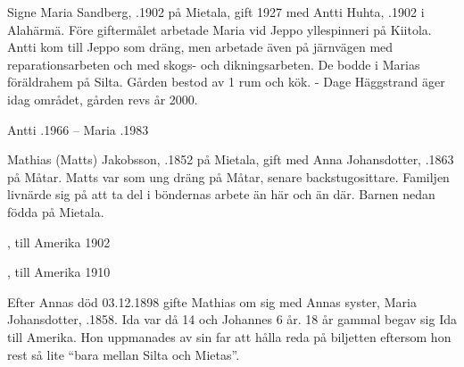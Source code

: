 


Signe Maria Sandberg, .1902 på Mietala, gift 1927 med Antti Huhta, .1902 i Alahärmä. Före giftermålet arbetade Maria vid Jeppo yllespinneri på Kiitola. Antti kom till Jeppo som dräng, men arbetade även på järnvägen med reparationsarbeten och med skogs- och dikningsarbeten. De bodde i Marias föräldrahem på Silta. Gården bestod av 1 rum och kök. - Dage Häggstrand äger idag området, gården revs år 2000.
\begin{jhchildren}
  \item {}
  \item {}
  \item {}
\end{jhchildren}

Antti .1966  --  Maria .1983


Mathias (Matts) Jakobsson, .1852 på Mietala, gift med Anna Johansdotter, .1863 på Måtar. Matts var som ung dräng på Måtar, senare backstugosittare. Familjen livnärde sig på att ta del i böndernas arbete än här och än där. Barnen nedan födda på Mietala.
\begin{jhchildren}
  \item {}, till Amerika 1902
  \item {}
  \item {}
  \item {}
  \item {}, till Amerika 1910
  \item {}
\end{jhchildren}

Efter Annas död 03.12.1898 gifte Mathias om sig med Annas syster, Maria Johansdotter,  .1858. Ida var då 14 och Johannes 6 år. 18 år gammal begav sig Ida till Amerika. Hon uppmanades av sin far att hålla reda på biljetten eftersom hon rest så lite ``bara mellan Silta och Mietas''.

